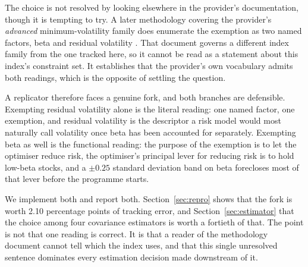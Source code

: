 The choice is not resolved by looking elsewhere in the provider's
documentation, though it is tempting to try. A later methodology covering the
provider's \emph{advanced} minimum-volatility family does enumerate the
exemption as two named factors, beta and residual volatility
\citep{msci2025minvoladvanced}. That document governs a different index family
from the one tracked here, so it cannot be read as a statement about this
index's constraint set. It establishes that the provider's own vocabulary
admits both readings, which is the opposite of settling the question.

A replicator therefore faces a genuine fork, and both branches are defensible.
Exempting residual volatility alone is the literal reading: one named factor,
one exemption, and residual volatility is the descriptor a risk model would
most naturally call volatility once beta has been accounted for separately.
Exempting beta as well is the functional reading: the purpose of the exemption
is to let the optimiser reduce risk, the optimiser's principal lever for
reducing risk is to hold low-beta stocks, and a $\pm0.25$ standard deviation
band on beta forecloses most of that lever before the programme starts.

We implement both and report both. Section~\ref{sec:repro} shows that the fork
is worth 2.10 percentage points of tracking error, and
Section~\ref{sec:estimator} that the choice among four covariance estimators is
worth a fortieth of that. The point is not that one reading is correct. It is
that a reader of the methodology document cannot tell which the index uses, and
that this single unresolved sentence dominates every estimation decision made
downstream of it.
